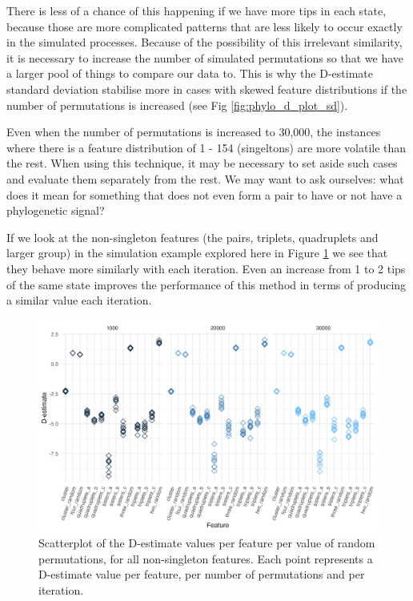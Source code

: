 \documentclass[12pt,letterpaper]{article}
\begin{document}
There is less of a chance of this happening if we have more tips in each state, because those are more complicated patterns that are less likely to occur exactly in the simulated processes. Because of the possibility of this irrelevant similarity, it is necessary to increase the number of simulated permutations so that we have a larger pool of things to compare our data to. This is why the D-estimate standard deviation stabilise more in cases with skewed feature distributions if the number of permutations is increased (see Fig \ref{fig:phylo_d_plot_sd}).


Even when the number of permutations is increased to 30,000, the instances where there is a feature distribution of 1 - 154 (singeltons) are more volatile than the rest. When using this technique, it may be necessary to set aside such cases and evaluate them separately from the rest. We may want to ask ourselves: what does it mean for something that does not even form a pair to have or not have a phylogenetic signal?

If we look at the non-singleton features (the pairs, triplets, quadruplets and larger group) in the simulation example explored here in Figure \ref{fig:phylo_d_plot_non_singles} we see that they behave more similarly with each iteration. Even an increase from 1 to 2 tips of the same state improves the performance of this method in terms of producing a similar value each iteration.

\begin{figure}[ht]
\centering
\includegraphics[width=14cm]{illustrations/plots_from_R/phylo_d_permut_plot.png}
\caption{Scatterplot of the D-estimate values per feature per value of random permutations, for all non-singleton features. Each point represents a D-estimate value per feature, per number of permutations and per iteration.}
\label{fig:phylo_d_plot_non_singles}
\end{figure}
\end{document}
